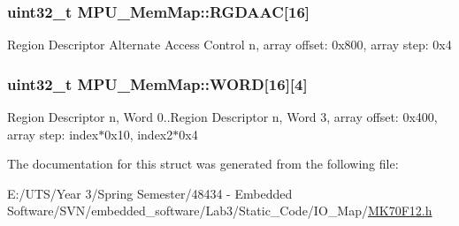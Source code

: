 \subsubsection[{R\+G\+D\+A\+A\+C}]{\setlength{\rightskip}{0pt plus 5cm}uint32\+\_\+t M\+P\+U\+\_\+\+Mem\+Map\+::\+R\+G\+D\+A\+A\+C\mbox{[}16\mbox{]}}\label{struct_m_p_u___mem_map_a7f9c813f610ff2ffa2027cec351b0b1f}
Region Descriptor Alternate Access Control n, array offset\+: 0x800, array step\+: 0x4 \hypertarget{struct_m_p_u___mem_map_ac0f1b1c2b2f2b70a90e02302add086f1}{}
\subsubsection[{W\+O\+R\+D}]{\setlength{\rightskip}{0pt plus 5cm}uint32\+\_\+t M\+P\+U\+\_\+\+Mem\+Map\+::\+W\+O\+R\+D\mbox{[}16\mbox{]}\mbox{[}4\mbox{]}}\label{struct_m_p_u___mem_map_ac0f1b1c2b2f2b70a90e02302add086f1}
Region Descriptor n, Word 0..Region Descriptor n, Word 3, array offset\+: 0x400, array step\+: index$\ast$0x10, index2$\ast$0x4 

The documentation for this struct was generated from the following file\+:\begin{DoxyCompactItemize}
\item 
E\+:/\+U\+T\+S/\+Year 3/\+Spring Semester/48434 -\/ Embedded Software/\+S\+V\+N/embedded\+\_\+software/\+Lab3/\+Static\+\_\+\+Code/\+I\+O\+\_\+\+Map/\hyperlink{_m_k70_f12_8h}{M\+K70\+F12.\+h}\end{DoxyCompactItemize}
